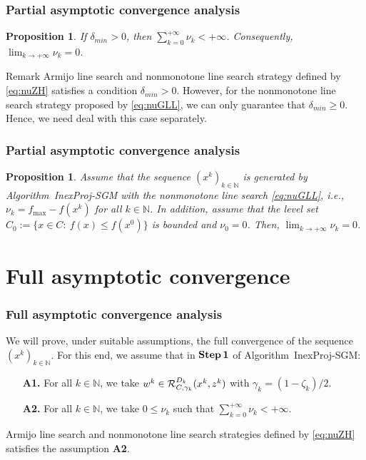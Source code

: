 \documentclass[xcolor=dvipsnames,aspectratio=169,13pt]{beamer} %
\newtheorem{proposition}[theorem]{Proposition}
\begin{document}
\begin{frame}[t]\frametitle{Partial asymptotic convergence analysis}
  \begin{proposition}
    If $\delta_{min}>0$,  then  $\displaystyle\sum_{k=0}^{+\infty} \nu_k<+\infty$. Consequently, $\displaystyle\lim_{k\to +\infty} \nu_{k} = 0$.
  \end{proposition}

  \begin{block}{Remark}
    Armijo line search and nonmonotone line search strategy defined by \eqref{eq:nuZH} satisfies  a condition $\delta_{min}>0$.  However,    for  the  nonmonotone line search strategy proposed by \eqref{eq:nuGLL},  we   can only guarantee that $\delta_{min}\geq 0$. Hence,  we need deal with this case separately.
  \end{block}
\end{frame}



\begin{frame}\frametitle{Partial asymptotic convergence analysis}
  \begin{proposition}
    Assume that the sequence  $(x^k)_{k\in\mathbb{N}}$ is generated by Algorithm~InexProj-SGM with the  nonmonotone line  search \eqref{eq:nuGLL}, i.e.,  $\nu_{k}= f_{\max}-f(x^k)$ for all  $k \in \mathbb{N}$. In addition,  assume that the level set $C_{0}:=\{ x\in C: ~ f(x)\leq f(x^0) \}$ is bounded and $\nu_0= 0$.  Then, $\displaystyle\lim_{k\to +\infty} \nu_{k} = 0$.
  \end{proposition}
\end{frame}


\section{Full asymptotic convergence}


\begin{frame}[t]\frametitle{Full asymptotic convergence analysis}
  We will prove, under suitable assumptions, the full convergence of the  sequence $(x^k)_{k\in\mathbb{N}}$.  For this end,  we   assume  that in ${\bf Step\,1}$  of  Algorithm~InexProj-SGM:
  \begin{itemize}
    \item[{\bf A1.}] For all $k \in \mathbb{N}$, we take   $w^k \in   {\cal R}_{C,\gamma_k}^{D_k}(x^{k}, z^k)$   with $\gamma_k=(1-\zeta_k)/2$.
      \item[{\bf A2.}]For all $k \in \mathbb{N}$,  we take  $0\leq \nu_{k}$ such that  $\sum_{k=0}^{+\infty} \nu_k<+\infty$.
  \end{itemize}
  Armijo line search and nonmonotone line search strategies defined by \eqref{eq:nuZH} satisfies  the assumption {\bf A2}. 

\end{frame}
\end{document}
